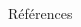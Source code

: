 \documentclass[final,hyperref={pdfpagelabels=false}]{beamer}
\begin{document}
\begin{frame}[t]
\begin{columns}[t]
\begin{column}{.465\textwidth}
\begin{block}{R\'ef\'erences}
\end{block}


\end{column} %

\begin{column}{.015\textwidth}\end{column} %

\end{columns} %

\end{frame} %
\end{document}
